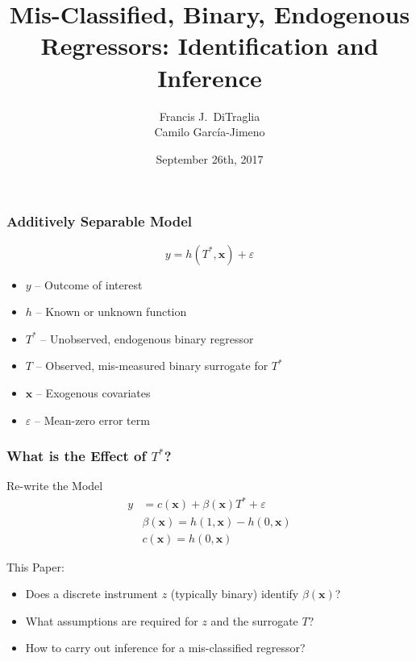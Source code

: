 \documentclass{beamer}
\title[Binary Regressors]{Mis-Classified, Binary, Endogenous Regressors: Identification and Inference}
\author[FJ DiTraglia]{Francis J.\ DiTraglia\\ Camilo Garc\'{i}a-Jimeno}
\institute{University of Pennsylvania}
\date{September 26th, 2017}
\begin{document}
 

\begin{frame}[plain]
	\titlepage 
\end{frame} 
\begin{frame}
  \frametitle{Additively Separable Model}
\[
  y = h(T^*, \mathbf{x}) + \varepsilon
\]
\vspace{-1em}
    \begin{itemize}    
    \item $y$ -- Outcome of interest
    \item $h$ -- Known or unknown function 
    \item $T^*$ -- Unobserved, endogenous binary regressor
    \item $T$ -- Observed, mis-measured binary surrogate for $T^*$
    \item $\mathbf{x}$ -- Exogenous covariates
    \item $\varepsilon$ -- Mean-zero error term
  \end{itemize}

\end{frame}
\begin{frame}
  \frametitle{What is the Effect of $T^*$?}
 
  \begin{block}{Re-write the Model}
\begin{align*}
  y &= c(\mathbf{x}) + \beta(\mathbf{x}) T^* + \varepsilon\\
  &\beta(\mathbf{x}) = h(1,\mathbf{x}) - h(0,\mathbf{x})\\
  &c(\mathbf{x}) = h(0,\mathbf{x})
\end{align*}
  \end{block}

  \begin{alertblock}{This Paper:}
    \begin{itemize}
      \item Does a discrete instrument $z$ (typically binary) identify $\beta(\mathbf{x})$? 
      \item What assumptions are required for $z$ and the surrogate $T$?
      \item How to carry out inference for a mis-classified regressor?
    \end{itemize}
  \end{alertblock}
\end{frame}
\end{document}
